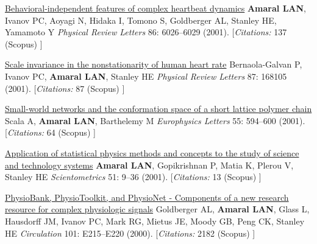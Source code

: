 \NumberedItem{\makebox[0.8cm][r]{[37]}}
\href{/people/amaral/behavioral-independence-features-of-complex-heartbeat-dynamics}
{Behavioral-independent features of complex heartbeat dynamics}
\newline
{\textbf{Amaral LAN}}, Ivanov PC, Aoyagi N, Hidaka I, Tomono S, Goldberger AL, Stanley HE, Yamamoto Y
\newline
\textit{Physical Review Letters}
    86:
6026--6029 (2001).
    [{\em{Citations:}}  137 (Scopus) ]
\newline
\Gap
~
\Gap

\NumberedItem{\makebox[0.8cm][r]{[36]}}
\href{/people/amaral/scale-invariance-in-the-nonstationarity-of-human-heart-rate}
{Scale invariance in the nonstationarity of human heart rate}
\newline
Bernaola-Galvan P, Ivanov PC, {\textbf{Amaral LAN}}, Stanley HE
\newline
\textit{Physical Review Letters}
    87:
168105 (2001).
    [{\em{Citations:}}  87 (Scopus) ]
\newline
\Gap
~
\Gap

\NumberedItem{\makebox[0.8cm][r]{[35]}}
\href{/people/amaral/small-world-networks-and-the-conformation-space-of-a-short-lattice-polymer-chain}
{Small-world networks and the conformation space of a short lattice polymer chain}
\newline
Scala A, {\textbf{Amaral LAN}}, Barthelemy M
\newline
\textit{Europhysics Letters}
    55:
594--600 (2001).
    [{\em{Citations:}}  64 (Scopus) ]
\newline
\Gap
~
\Gap

\NumberedItem{\makebox[0.8cm][r]{[34]}}
\href{/people/amaral/application-of-statistical-physics-methods-and-concepts-to-the-study-of-science-technology-systems}
{Application of statistical physics methods and concepts to the study of science and technology systems}
\newline
{\textbf{Amaral LAN}}, Gopikrishnan P, Matia K, Plerou V, Stanley HE
\newline
\textit{Scientometrics}
    51:
9--36 (2001).
    [{\em{Citations:}}  13 (Scopus) ]
\newline
\Gap
~
\Gap

\NumberedItem{\makebox[0.8cm][r]{[33]}}
\href{/people/amaral/physiobank-physiotoolkit-and-physionet-components-of-a-new-research-resource-for-complex-physiologic-signals}
{PhysioBank, PhysioToolkit, and PhysioNet - Components of a new research resource for complex physiologic signals}
\newline
Goldberger AL, {\textbf{Amaral LAN}}, Glass L, Hausdorff JM, Ivanov PC, Mark RG, Mietus JE, Moody GB, Peng CK, Stanley HE
\newline
\textit{Circulation}
    101:
E215--E220 (2000).
    [{\em{Citations:}}  2182 (Scopus) ]
\newline
\Gap
~
\Gap

